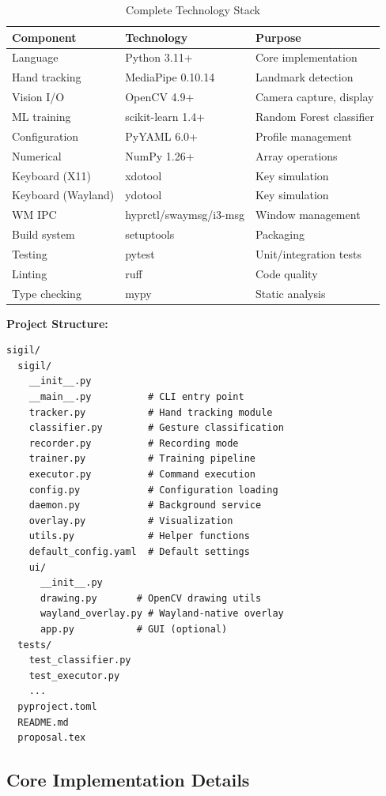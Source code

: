 \documentclass[11pt,a4paper]{article}
\begin{document}
\begin{table}[H]
\centering
\begin{tabular}{@{}lll@{}}
\toprule
\textbf{Component} & \textbf{Technology} & \textbf{Purpose} \\
\midrule
Language & Python 3.11+ & Core implementation \\
Hand tracking & MediaPipe 0.10.14 & Landmark detection \\
Vision I/O & OpenCV 4.9+ & Camera capture, display \\
ML training & scikit-learn 1.4+ & Random Forest classifier \\
Configuration & PyYAML 6.0+ & Profile management \\
Numerical & NumPy 1.26+ & Array operations \\
Keyboard (X11) & xdotool & Key simulation \\
Keyboard (Wayland) & ydotool & Key simulation \\
WM IPC & hyprctl/swaymsg/i3-msg & Window management \\
Build system & setuptools & Packaging \\
Testing & pytest & Unit/integration tests \\
Linting & ruff & Code quality \\
Type checking & mypy & Static analysis \\
\bottomrule
\end{tabular}
\caption{Complete Technology Stack}
\end{table}

\textbf{Project Structure:}
\begin{lstlisting}
sigil/
  sigil/
    __init__.py
    __main__.py          # CLI entry point
    tracker.py           # Hand tracking module
    classifier.py        # Gesture classification
    recorder.py          # Recording mode
    trainer.py           # Training pipeline
    executor.py          # Command execution
    config.py            # Configuration loading
    daemon.py            # Background service
    overlay.py           # Visualization
    utils.py             # Helper functions
    default_config.yaml  # Default settings
    ui/
      __init__.py
      drawing.py       # OpenCV drawing utils
      wayland_overlay.py # Wayland-native overlay
      app.py           # GUI (optional)
  tests/
    test_classifier.py
    test_executor.py
    ...
  pyproject.toml
  README.md
  proposal.tex
\end{lstlisting}

\subsection{Core Implementation Details}
\end{document}
